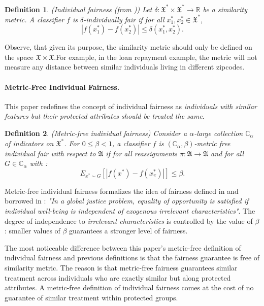 \documentclass{article}
\newtheorem{defn}{Definition}[section]
\begin{document}
\begin{defn}(Individual fairness (from \cite{dwork2012fairness}))
\label{def: if}
Let $\delta:\mathfrak{X}^{*} \times \mathfrak{X}^{*} \rightarrow \mathbb{R}$ be a similarity metric. A classifier $f$ is $\delta$-individually fair if for all $x_{1}^{*}, x_{2}^{*} \in \mathfrak{X}^{*}$, 
$$|f(x_{1}^{*}) - f(x_{2}^{*})| \leq \delta(x_{1}^{*}, x_{2}^{*}).$$
\end{defn}

Observe, that given its purpose, the similarity metric should only be defined on the space $\mathfrak{X} \times \mathfrak{X}$.For example, in the loan repayment example, the metric will not measure any distance between similar individuals living in different zipcodes. 

\paragraph{Metric-Free Individual Fairness.}
This paper redefines the concept of individual fairness as \textit{individuals with similar features but their protected attributes should be treated the same}. 


\begin{defn}(Metric-free individual fairness)
\label{def: mfif}
Consider a $\alpha$-large collection $\mathbb{C}_{\alpha}$ of indicators on $\mathfrak{X}^{*}$. For $0\leq \beta <1$, a classifier $f$ is $(\mathbb{C}_{\alpha}, \beta)$-metric free individual fair with respect to $\mathfrak{A}$ if for all reassignments $\pi: \mathfrak{A} \rightarrow \mathfrak{A}$ and for all $G\in \mathbb{C}_{\alpha}$ with :
$$  E_{x^{*}\sim G}[|f(x^{*}) - f(x^{*}_{\pi})|] \leq \beta.$$
\end{defn}

Metric-free individual fairness formalizes the idea of fairness defined in \cite{calsamiglia2009decentralizing} and borrowed in \cite{dwork2012fairness}: \textit{"In a global justice problem, equality of opportunity is satisfied if individual well-being is 
independent of exogenous irrelevant characteristics"}. The degree of independence to \textit{irrelevant characteristics} is controlled by the value of $\beta$: smaller values of $\beta$ guarantees a stronger level of fairness. 

\bigskip
The most noticeable difference between this paper's metric-free definition of individual fairness and previous definitions is that the fairness guarantee is free of similarity metric. The reason is that metric-free fairness guarantees similar treatment across individuals who are exactly similar but along protected attributes. A metric-free definition of individual fairness comes at the cost of no guarantee of similar treatment within protected groups.
\end{document}
